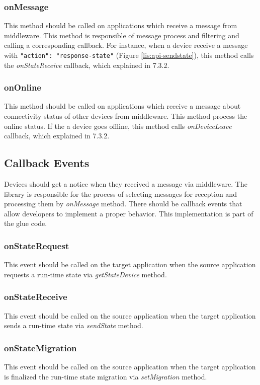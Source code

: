 \subsubsection{onMessage}
This method should be called on applications which receive a message from middleware. This method is responsible of message process and filtering and calling a corresponding callback. For instance, when a device receive a message with \texttt{{"action": "response-state"}} (Figure \ref{lis:api-sendstate}), this method calls the \textit{onStateReceive} callback, which explained in 7.3.2.


\subsubsection{onOnline}
This method should be called on applications which receive a message about connectivity status of other devices from middleware. This method process the online status. If the a device goes offline, this method calls \textit{onDeviceLeave} callback, which explained in 7.3.2.

\subsection{Callback Events}
Devices should get a notice when they received a message via middleware. The library is responsible for the process of selecting messages for reception and processing them by \textit{onMessage} method. There should be callback events that allow developers to implement a proper behavior. This implementation is part of the glue code.

\subsubsection{onStateRequest}
This event should be called on the target application when the source application requests a run-time state via \textit{getStateDevice} method.

\subsubsection{onStateReceive}
This event should be called on the source application when the target application sends a run-time state via \textit{sendState} method.

\subsubsection{onStateMigration}
This event should be called on the source application when the target application is finalized the run-time state migration via \textit{setMigration} method.

